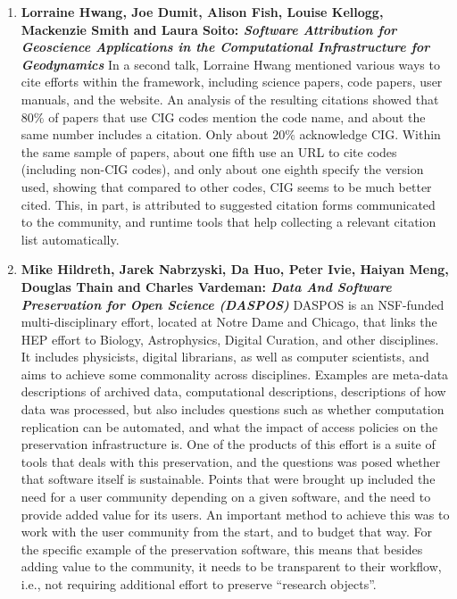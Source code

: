 \documentclass[11pt, oneside]{amsart}
\begin{document}
\begin{enumerate}
\item \textbf{Lorraine Hwang, Joe Dumit, Alison Fish, Louise Kellogg, Mackenzie
Smith and Laura Soito: \textit{Software Attribution for Geoscience Applications in the
Computational Infrastructure for Geodynamics}}
In a second talk, Lorraine Hwang mentioned various ways to cite
efforts within the framework, including science papers, code papers, user
manuals, and the website. An analysis of the resulting
citations showed that $80\%$ of papers that use CIG codes mention the code name, and about
the same number includes a citation. Only about $20\%$ acknowledge CIG. Within
the same sample of papers, about one fifth use an URL to cite codes
(including non-CIG codes), and only about one eighth specify the version used,
showing that compared to other codes, CIG seems to be much better cited. This,
in part, is attributed to suggested citation forms communicated to the community,
and runtime tools that help collecting a relevant citation list automatically.

\item \textbf{Mike Hildreth, Jarek Nabrzyski, Da Huo, Peter Ivie, Haiyan Meng,
Douglas Thain and Charles Vardeman: \textit{Data And Software Preservation for Open
Science (DASPOS)}}
DASPOS is an NSF-funded multi-disciplinary effort, located at Notre
Dame and Chicago, that links the HEP effort to Biology, Astrophysics, Digital
Curation, and other disciplines. It includes physicists, digital librarians, as
well as computer scientists, and aims to achieve some commonality across
disciplines. Examples are meta-data descriptions of archived data,
computational descriptions, descriptions of how data was processed, but also
includes questions such as whether computation replication can be automated, and
what the impact of access policies on the preservation infrastructure is. One
of the products of this effort is a suite of tools that deals with this
preservation, and the questions was posed whether that software itself is
sustainable. Points that were brought up included the need for a user community
depending on a given software, and the need to provide added value for its
users. An important method to achieve this was to work with the user
community from the start, and to budget that way. For the specific example of
the preservation software, this means that besides adding value to the
community, it needs to be transparent to their workflow, i.e., not requiring
additional effort to preserve ``research objects''.


\end{enumerate}
\end{document}
